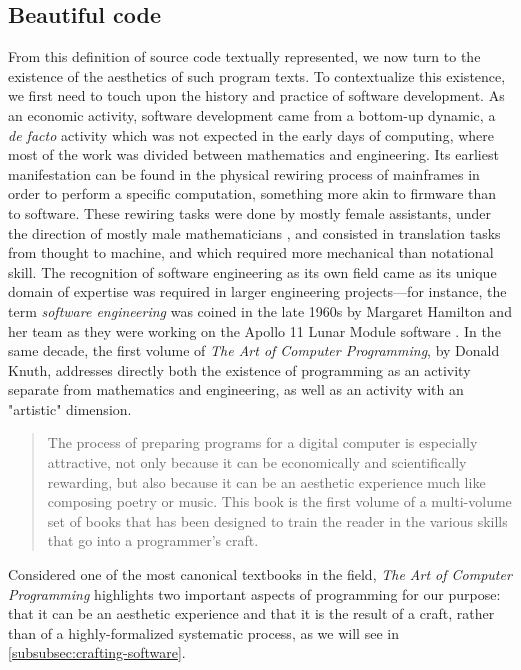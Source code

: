 \subsection{Beautiful code}
\label{subsec:beautiful-code}

From this definition of source code textually represented, we now turn to the existence of the aesthetics of such program texts. To contextualize this existence, we first need to touch upon the history and practice of software development. As an economic activity, software development came from a bottom-up dynamic, a \emph{de facto} activity which was not expected in the early days of computing, where most of the work was divided between mathematics and engineering. Its earliest manifestation can be found in the physical rewiring process of mainframes in order to perform a specific computation, something more akin to firmware than to software. These rewiring tasks were done by mostly female assistants, under the direction of mostly male mathematicians \citep{chun_software_2005}, and consisted in translation tasks from thought to machine, and which required more mechanical than notational skill. The recognition of software engineering as its own field came as its unique domain of expertise was required in larger engineering projects—for instance, the term \emph{software engineering} was coined in the late 1960s by Margaret Hamilton and her team as they were working on the Apollo 11 Lunar Module software \citep{mindell_digital_2011}. In the same decade, the first volume of \emph{The Art of Computer Programming}, by Donald Knuth, addresses directly both the existence of programming as an activity separate from mathematics and engineering, as well as an activity with an "artistic" dimension.

\begin{quote}
    The process of preparing programs for a digital computer is especially attractive, not only because it can be economically and scientifically rewarding, but also because it can be an aesthetic experience much like composing poetry or music. This book is the first volume of a multi-volume set of books that has been designed to train the reader in the various skills that go into a programmer's craft. \citep{knuth_art_1997}
\end{quote}

Considered one of the most canonical textbooks in the field, \emph{The Art of Computer Programming} highlights two important aspects of programming for our purpose: that it can be an aesthetic experience and that it is the result of a craft, rather than of a highly-formalized systematic process, as we will see in \ref{subsubsec:crafting-software}.


